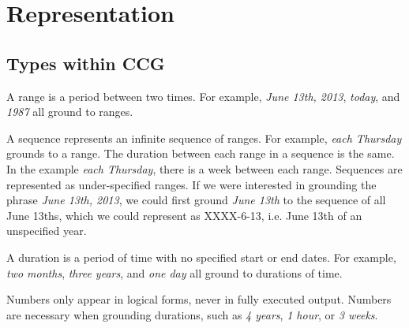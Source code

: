\section{Representation}
\label{sec:representation}




\subsection{Types within CCG}
\label{sec:CCGtypes}
\begin{definition}[Range]
A range is a period between two times. For example, \emph{June 13th, 2013}, \emph{today}, and \emph{1987} all ground to ranges.
\end{definition}

\begin{definition}[Sequence] 
A sequence represents an infinite sequence of ranges. For example, \emph{each Thursday} grounds to a range. The duration between each range in a sequence is the same. In the example \emph{each Thursday}, there is a week between each range. Sequences are represented as under-specified ranges. If we were interested in grounding the phrase \emph{June 13th, 2013}, we could first ground \emph{June 13th} to the sequence of all June 13ths, which we could represent as XXXX-6-13, i.e. June 13th of an unspecified year.
\end{definition}

\begin{definition}[Duration]
A duration is a period of time with no specified start or end dates. For example, \emph{two months}, \emph{three years}, and \emph{one day} all ground to durations of time. 
\end{definition}

\begin{definition}[Number]
Numbers only appear in logical forms, never in fully executed output. Numbers are necessary when grounding durations, such as \emph{4 years}, \emph{1 hour}, or \emph{3 weeks}. 
\end{definition}


